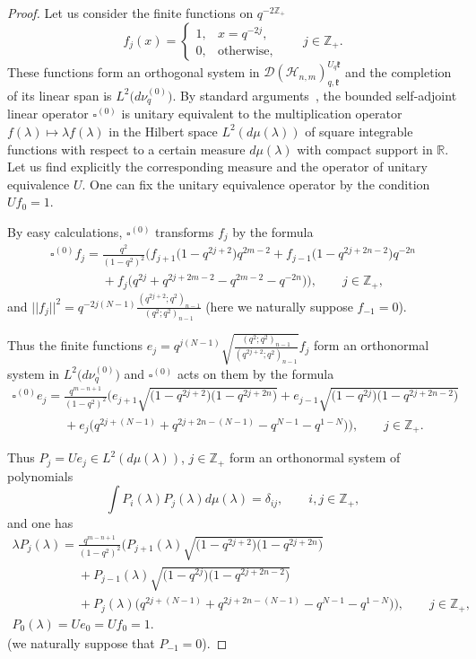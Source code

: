 \documentclass[11pt]{article}
\begin{document}
\begin{proof} Let us consider the f\/inite functions on $q^{-2\mathbb Z_+}$
\[
f_j(x)=
\begin{cases} 1, & x=q^{-2j},\\ 0, & \text{otherwise}, \end{cases}
\qquad j \in \mathbb Z_+.
\]
These functions form an orthogonal system in $\mathscr{D}(\mathscr{H}_{n,m})_{q,\mathfrak{k}}^{U_q \mathfrak{k}}$
and the completion of its linear span is $L^2\big(d\nu_q^{(0)}\big)$. By standard arguments~\cite{AG}, the bounded
self-adjoint linear operator $\square^{(0)}$ is unitary equivalent to the multiplication operator $f(\lambda)
\mapsto \lambda f(\lambda)$ in the Hilbert space $L^2(d\mu(\lambda))$ of square integrable functions with
respect to a certain measure $d\mu(\lambda)$ with compact support in $\mathbb R$. Let us f\/ind explicitly the
corresponding measure and the operator of unitary equivalence $U$. One can f\/ix the unitary equivalence
operator by the condition $Uf_0=1$.

By easy calculations, $\square^{(0)}$ transforms $f_j$ by the formula
\begin{gather*}
\square^{(0)}f_j=\frac{q^2}{(1-q^2)^2} \big( f_{j+1}\big(1-q^{2j+2}\big)q^{2m-2}+f_{j-1}\big(1-q^{2j+2n-2}\big)q^{-2n}\\
\phantom{\square^{(0)}f_j=}{} +f_j
\big(q^{2j}+q^{2j+2m-2}-q^{2m-2}-q^{-2n}\big)\big), \qquad j \in \mathbb Z_+,
\end{gather*}
and $||f_j||^2=q^{-2j(N-1)}\frac{(q^{2j+2};q^2)_{n-1}}{(q^2;q^2)_{n-1}}$ (here we naturally suppose
$f_{-1}=0$).

{\sloppy Thus the f\/inite functions $e_j=q^{j(N-1)}\sqrt{\frac{(q^{2};q^2)_{n-1}}{(q^{2j+2};q^2)_{n-1}}}f_j$ form an
orthonormal system in $L^2\big(d\nu_q^{(0)}\big)$ and $\square^{(0)}$ acts on them by the formula
\begin{gather*}
\square^{(0)}e_j=\frac{q^{m-n+1}}{(1-q^2)^2}\Big(
e_{j+1}\sqrt{\big(1-q^{2j+2}\big)\big(1-q^{2j+2n}\big)}+e_{j-1}\sqrt{\big(1-q^{2j}\big)\big(1-q^{2j+2n-2}\big)} \\
\phantom{\square^{(0)}e_j=}{}+e_j
\big(q^{2j+(N-1)}+q^{2j+2n-(N-1)}-q^{N-1}-q^{1-N}\big)\Big), \qquad j \in \mathbb Z_+.
\end{gather*}

}

Thus $P_j=Ue_j \in L^2(d\mu(\lambda))$, $j\in\mathbb{Z}_+$ form an orthonormal system of polynomials
\[
\int P_i(\lambda)P_j(\lambda)d\mu(\lambda)=\delta_{ij},\qquad i,j\in\mathbb{Z}_+,
\]
and one has{\samepage
\begin{gather}
\lambda P_j(\lambda)= \frac{q^{m-n+1}}{(1-q^2)^2}
\Big(P_{j+1}(\lambda)\sqrt{\big(1-q^{2j+2}\big)\big(1-q^{2j+2n}\big)}\nonumber\\
\phantom{\lambda P_j(\lambda)=}{}
 +P_{j-1} (\lambda) \sqrt{\big(1-q^{2j}\big)
\big(1-q^{2j+2n-2}\big)}\nonumber\\
\phantom{\lambda P_j(\lambda)=}{}
+P_j(\lambda) \big(q^{2j+(N-1)}+q^{2j+2n-(N-1)}-q^{N-1}-q^{1-N}\big)\Big), \qquad j \in \mathbb Z_+,\label{P_rec}
\\
\label{init_P0}
P_0(\lambda)=Ue_0=Uf_0=1.
\end{gather}
(we naturally suppose that $P_{-1}=0$).}


\end{proof}
\end{document}
